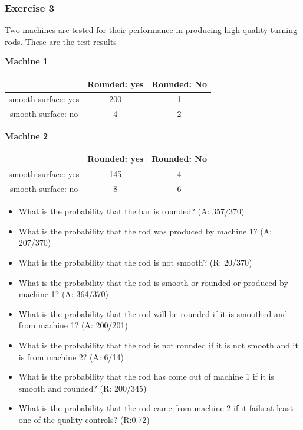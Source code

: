 \documentclass[
]{book}
\providecommand{\tightlist}{%
  \setlength{\itemsep}{0pt}\setlength{\parskip}{0pt}}
\begin{document}
\hypertarget{exercise-3-1}{%
\subsubsection{Exercise 3}\label{exercise-3-1}}

Two machines are tested for their performance in producing high-quality turning rods. These are the test results

\textbf{Machine 1}

\begin{longtable}[]{@{}ccc@{}}
\toprule\noalign{}
& Rounded: yes & Rounded: No \\
\midrule\noalign{}
\endhead
\bottomrule\noalign{}
\endlastfoot
smooth surface: yes & 200 & 1 \\
smooth surface: no & 4 & 2 \\
\end{longtable}

\textbf{Machine 2}

\begin{longtable}[]{@{}ccc@{}}
\toprule\noalign{}
& Rounded: yes & Rounded: No \\
\midrule\noalign{}
\endhead
\bottomrule\noalign{}
\endlastfoot
smooth surface: yes & 145 & 4 \\
smooth surface: no & 8 & 6 \\
\end{longtable}

\begin{itemize}
\tightlist
\item
  What is the probability that the bar is rounded? (A: 357/370)
\item
  What is the probability that the rod was produced by machine 1? (A: 207/370)
\item
  What is the probability that the rod is not smooth? (R: 20/370)
\item
  What is the probability that the rod is smooth or rounded or produced by machine 1? (A: 364/370)
\item
  What is the probability that the rod will be rounded if it is smoothed and from machine 1? (A: 200/201)
\item
  What is the probability that the rod is not rounded if it is not smooth and it is from machine 2? (A: 6/14)
\item
  What is the probability that the rod has come out of machine 1 if it is smooth and rounded? (R: 200/345)
\item
  What is the probability that the rod came from machine 2 if it fails at least one of the quality controls? (R:0.72)
\end{itemize}
\end{document}
